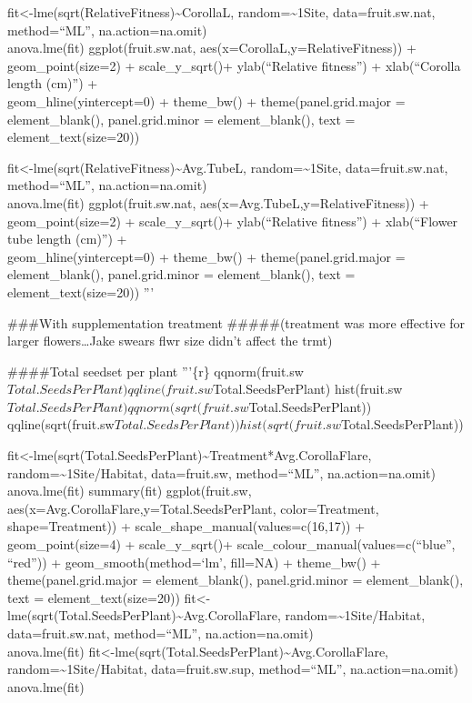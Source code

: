 \documentclass[]{article}
\begin{document}
fit\textless{}-lme(sqrt(RelativeFitness)\textasciitilde{}CorollaL,
random=\textasciitilde{}1\textbar{}Site, data=fruit.sw.nat,
method=``ML'', na.action=na.omit)\\
anova.lme(fit) ggplot(fruit.sw.nat, aes(x=CorollaL,y=RelativeFitness)) +
geom\_point(size=2) + scale\_y\_sqrt()+ ylab(``Relative fitness'') +
xlab(``Corolla length (cm)'') +\\
geom\_hline(yintercept=0) + theme\_bw() + theme(panel.grid.major =
element\_blank(), panel.grid.minor = element\_blank(), text =
element\_text(size=20))

fit\textless{}-lme(sqrt(RelativeFitness)\textasciitilde{}Avg.TubeL,
random=\textasciitilde{}1\textbar{}Site, data=fruit.sw.nat,
method=``ML'', na.action=na.omit)\\
anova.lme(fit) ggplot(fruit.sw.nat, aes(x=Avg.TubeL,y=RelativeFitness))
+ geom\_point(size=2) + scale\_y\_sqrt()+ ylab(``Relative fitness'') +
xlab(``Flower tube length (cm)'') +\\
geom\_hline(yintercept=0) + theme\_bw() + theme(panel.grid.major =
element\_blank(), panel.grid.minor = element\_blank(), text =
element\_text(size=20)) '''

\#\#\#With supplementation treatment \#\#\#\#\#(treatment was more
effective for larger flowers\ldots{}Jake swears flwr size didn't affect
the trmt)

\#\#\#\#Total seedset per plant '''\{r\}
qqnorm(fruit.sw\(Total.SeedsPerPlant) qqline(fruit.sw\)Total.SeedsPerPlant)
hist(fruit.sw\(Total.SeedsPerPlant) qqnorm(sqrt(fruit.sw\)Total.SeedsPerPlant))
qqline(sqrt(fruit.sw\(Total.SeedsPerPlant)) hist(sqrt(fruit.sw\)Total.SeedsPerPlant))

fit\textless{}-lme(sqrt(Total.SeedsPerPlant)\textasciitilde{}Treatment*Avg.CorollaFlare,
random=\textasciitilde{}1\textbar{}Site/Habitat, data=fruit.sw,
method=``ML'', na.action=na.omit)\\
anova.lme(fit) summary(fit) ggplot(fruit.sw,
aes(x=Avg.CorollaFlare,y=Total.SeedsPerPlant, color=Treatment,
shape=Treatment)) + scale\_shape\_manual(values=c(16,17)) +
geom\_point(size=4) + scale\_y\_sqrt()+
scale\_colour\_manual(values=c(``blue'', ``red'')) +
geom\_smooth(method=`lm', fill=NA) + theme\_bw() +
theme(panel.grid.major = element\_blank(), panel.grid.minor =
element\_blank(), text = element\_text(size=20))
fit\textless{}-lme(sqrt(Total.SeedsPerPlant)\textasciitilde{}Avg.CorollaFlare,
random=\textasciitilde{}1\textbar{}Site/Habitat, data=fruit.sw.nat,
method=``ML'', na.action=na.omit)\\
anova.lme(fit)
fit\textless{}-lme(sqrt(Total.SeedsPerPlant)\textasciitilde{}Avg.CorollaFlare,
random=\textasciitilde{}1\textbar{}Site/Habitat, data=fruit.sw.sup,
method=``ML'', na.action=na.omit)\\
anova.lme(fit)
\end{document}
